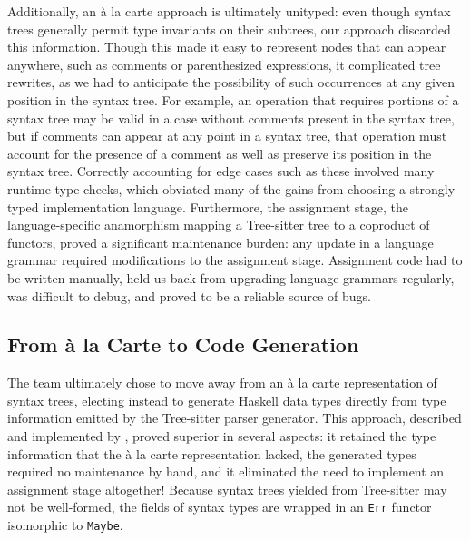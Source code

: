 \documentclass[acmsmall,fleqn]{acmart}
\begin{document}
Additionally, an à la carte approach is ultimately unityped: even though syntax
trees generally permit type invariants on their subtrees, our approach
discarded this information. Though this made it easy to represent nodes that
can appear anywhere, such as comments or parenthesized expressions, it
complicated tree rewrites, as we had to anticipate the possibility of such
occurrences at any given position in the syntax tree. For example, an operation
that requires portions of a syntax tree may be valid in a case without comments
present in the syntax tree, but if comments can appear at any point in a syntax
tree, that operation must account for the presence of a comment as well as
preserve its position in the syntax tree. Correctly accounting for edge cases
such as these involved many runtime type checks, which obviated many of the
gains from choosing a strongly typed implementation language. Furthermore, the
assignment stage, the language-specific anamorphism mapping a Tree-sitter tree
to a coproduct of functors, proved a significant maintenance burden: any update
in a language grammar required modifications to the assignment stage. Assignment
code had to be written manually, held us back from upgrading language grammars
regularly, was difficult to debug, and proved to be a reliable source of bugs.

\subsection{From à la Carte to Code Generation} \label{sec:codegen}

The team ultimately chose to move away from an à la carte representation of
syntax trees, electing instead to generate Haskell data types directly from type
information emitted by the Tree-sitter parser generator. This approach,
described and implemented by \citet{Nadeem20CodeGen}, proved superior in several
aspects: it retained the type information that the à la carte representation
lacked, the generated types required no maintenance by hand, and it eliminated
the need to implement an assignment stage altogether! Because syntax trees
yielded from Tree-sitter may not be well-formed, the fields of syntax types are
wrapped in an \texttt{Err} functor isomorphic to \texttt{Maybe}.
\end{document}
